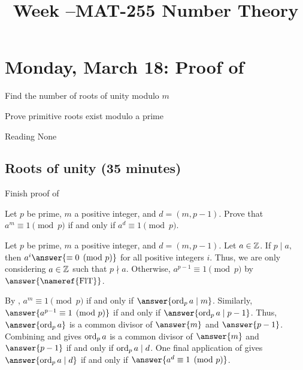 \documentclass[letterpaper, 11 pt]{ximera}
\title{Week \week--MAT-255 Number Theory}
\theoremstyle{definition}
\begin{document}
\section{Monday, March 18: Proof of }

\begin{obj}
    \item Find the number of roots of unity modulo $m$
    \item Prove primitive roots exist modulo a prime
\end{obj}


\begin{pre}
    \item[Reading] None
\end{pre}

\subsection{Roots of unity (35 minutes)}

Finish proof of 


\begin{br}\label{br:condition-root-unity}
    Let $p$ be prime, $m$ a positive integer, and $d=(m,p-1).$ Prove that $a^m\equiv 1\pmod{p}$ if and only if $a^d\equiv 1\pmod{p}.$


    \begin{solution}
        Let $p$ be prime, $m$ a positive integer, and $d=(m,p-1).$ Let $a\in\mathbb Z$. If $p\mid a,$ then $a^i\answer{\equiv 0\pmod{p}}$ for all positive integers $i$. 
        Thus, we are only considering $a\in\mathbb Z$ such that $p\nmid a.$
        Otherwise, $a^{p-1}\equiv 1\pmod{p}$ by $\answer{\textnormal{\nameref{FlT}}}$.
        
        By , $a^m\equiv 1\pmod{p}$ if and only if $\answer{\ord_p a \mid m}$. Similarly, $\answer{a^{p-1}\equiv 1\pmod{p}}$ if and only if $\answer{\ord_p a \mid p-1}$. Thus, $\answer{\ord_p a}$ is a common divisor of $\answer{m}$ and $\answer{p-1}$. Combining  and  gives $\operatorname{ord}_p a$ is a common divisor of   $\answer{m}$ and $\answer{p-1}$ if and only if $\operatorname{ord}_p a\mid d$. One final application of  gives $\answer{\ord_p a\mid d}$ if and only if $\answer{a^d\equiv 1\pmod{p}}$.
    \end{solution}
\end{br}
\end{document}
